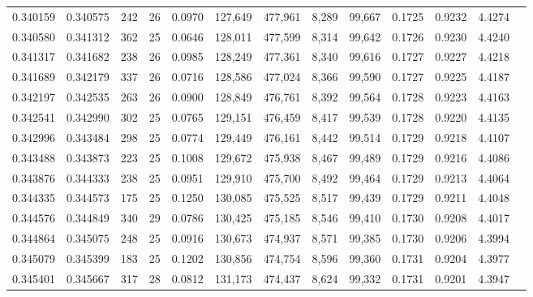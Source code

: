 \begin{tabular}{rrrrrrrrrrrrr}
0.340159 & 0.340575 & 242 &  26 &                                     0.0970 & 127,649 & 477,961 &   8,289 &  99,667 & 0.1725 & 0.9232 & 4.4274 \\
0.340580 & 0.341312 & 362 &  25 &                                     0.0646 & 128,011 & 477,599 &   8,314 &  99,642 & 0.1726 & 0.9230 & 4.4240 \\
0.341317 & 0.341682 & 238 &  26 &                                     0.0985 & 128,249 & 477,361 &   8,340 &  99,616 & 0.1727 & 0.9227 & 4.4218 \\
0.341689 & 0.342179 & 337 &  26 &                                     0.0716 & 128,586 & 477,024 &   8,366 &  99,590 & 0.1727 & 0.9225 & 4.4187 \\
0.342197 & 0.342535 & 263 &  26 &                                     0.0900 & 128,849 & 476,761 &   8,392 &  99,564 & 0.1728 & 0.9223 & 4.4163 \\
0.342541 & 0.342990 & 302 &  25 &                                     0.0765 & 129,151 & 476,459 &   8,417 &  99,539 & 0.1728 & 0.9220 & 4.4135 \\
0.342996 & 0.343484 & 298 &  25 &                                     0.0774 & 129,449 & 476,161 &   8,442 &  99,514 & 0.1729 & 0.9218 & 4.4107 \\
0.343488 & 0.343873 & 223 &  25 &                                     0.1008 & 129,672 & 475,938 &   8,467 &  99,489 & 0.1729 & 0.9216 & 4.4086 \\
0.343876 & 0.344333 & 238 &  25 &                                     0.0951 & 129,910 & 475,700 &   8,492 &  99,464 & 0.1729 & 0.9213 & 4.4064 \\
0.344335 & 0.344573 & 175 &  25 &                                     0.1250 & 130,085 & 475,525 &   8,517 &  99,439 & 0.1729 & 0.9211 & 4.4048 \\
0.344576 & 0.344849 & 340 &  29 &                                     0.0786 & 130,425 & 475,185 &   8,546 &  99,410 & 0.1730 & 0.9208 & 4.4017 \\
0.344864 & 0.345075 & 248 &  25 &                                     0.0916 & 130,673 & 474,937 &   8,571 &  99,385 & 0.1730 & 0.9206 & 4.3994 \\
0.345079 & 0.345399 & 183 &  25 &                                     0.1202 & 130,856 & 474,754 &   8,596 &  99,360 & 0.1731 & 0.9204 & 4.3977 \\
0.345401 & 0.345667 & 317 &  28 &                                     0.0812 & 131,173 & 474,437 &   8,624 &  99,332 & 0.1731 & 0.9201 & 4.3947 \\

\end{tabular}
